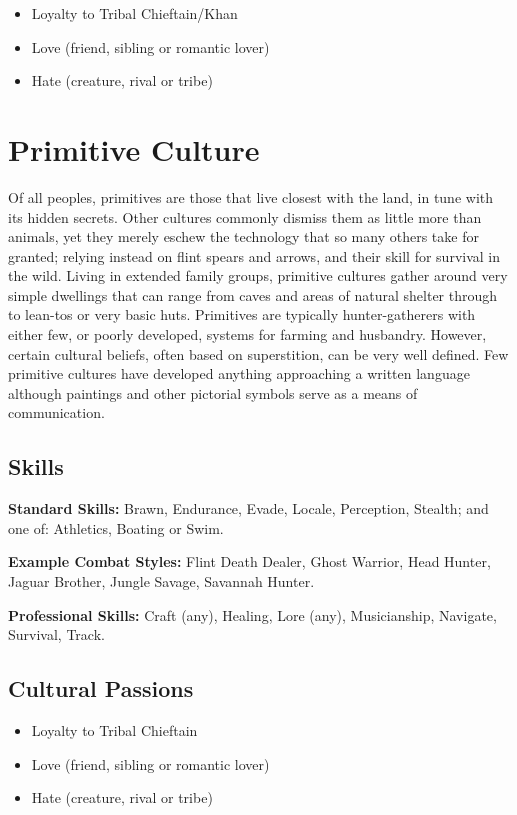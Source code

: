 \documentclass[10pt]{article}
\begin{document}
\begin{itemize}
    \item Loyalty to Tribal Chieftain/Khan
    \item Love (friend, sibling or romantic lover)
    \item Hate (creature, rival or tribe)
\end{itemize}

\section{Primitive Culture}
\label{sec:primitive}

Of all peoples, primitives are those that live closest with the land, in tune with its hidden secrets. Other cultures commonly dismiss them as little more than animals, yet they merely eschew the technology that so many others take for granted; relying instead on flint spears and arrows, and their skill for survival in the wild. Living in extended family groups, primitive cultures gather around very simple dwellings that can range from caves and areas of natural shelter through to lean-tos or very basic huts. Primitives are typically hunter-gatherers with either few, or poorly developed, systems for farming and husbandry. However, certain cultural beliefs, often based on superstition, can be very well defined. Few primitive cultures have developed anything approaching a written language although paintings and other pictorial symbols serve as a means of communication.


\subsection{Skills}
\label{sec:primitive-skills}

\textbf{Standard Skills:} Brawn, Endurance, Evade, Locale, Perception, Stealth; and one of: Athletics, Boating or Swim.

\textbf{Example Combat Styles:} Flint Death Dealer, Ghost Warrior, Head Hunter, Jaguar Brother, Jungle Savage, Savannah Hunter.

\textbf{Professional Skills:} Craft (any), Healing, Lore (any), Musicianship, Navigate, Survival, Track.

\subsection{Cultural Passions}
\label{sec:primitive-passions}

\begin{itemize}
    \item Loyalty to Tribal Chieftain
    \item Love (friend, sibling or romantic lover)
    \item Hate (creature, rival or tribe)
\end{itemize}
\end{document}

